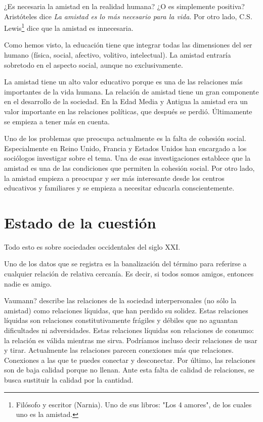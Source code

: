 \documentclass[palatino]{apuntesURJC}
\begin{document}
¿Es necesaria la amistad en la realidad humana? ¿O es simplemente positiva?
%
Aristóteles dice \textit{La amistad es lo más necesario para la vida}. 
%
Por otro lado, C.S. Lewis\footnote{Filósofo y escritor (Narnia). Uno de sus libros: "Los 4 amores", de los cuales uno es la amistad.} dice que la amistad es innecesaria.

Como hemos visto, la educación tiene que integrar todas las dimensiones del ser humano (física, social, afectivo, volitivo, intelectual).
%
La amistad entraría sobretodo en el aspecto social, aunque no exclusivamente.

La amistad tiene un alto valor educativo porque es una de las relaciones más importantes de la vida humana.
%
La relación de amistad tiene un gran componente en el desarrollo de la sociedad.
%
En la Edad Media y Antigua la amistad era un valor importante en las relaciones políticas, que después se perdió.
%
Últimamente se empieza a tener más en cuenta.

Uno de los problemas que preocupa actualmente es la falta de cohesión social. 
%
Especialmente en Reino Unido, Francia y Estados Unidos han encargado a los sociólogos investigar sobre el tema.
%
Una de esas investigaciones establece que la amistad es una de las condiciones que permiten la cohesión social.
%
Por otro lado, la amistad empieza a preocupar y ser más interesante desde los centros educativos y familiares y se empieza a necesitar educarla conscientemente.

\section{Estado de la cuestión}

Todo esto es sobre sociedades occidentales del siglo XXI.

Uno de los datos que se registra es la banalización del término para referirse a cualquier relación de relativa cercanía. Es decir, si todos somos amigos, entonces nadie es amigo.

Vaumann? describe las relaciones de la sociedad interpersonales (no sólo la amistad) como relaciones líquidas, que han perdido su solidez.
%
Estas relaciones líquidas son relaciones constitutivamente frágiles y débiles que no aguantan dificultades ni adversidades.
%
Estas relaciones líquidas son relaciones de consumo: 
%
la relación es válida mientras me sirva. 
%
Podríamos incluso decir relaciones de usar y tirar.
%
Actualmente las relaciones parecen conexiones más que relaciones.
%
Conexiones a las que te puedes conectar y desconectar.
%
Por último, las relaciones son de baja calidad porque no llenan.
%
Ante esta falta de calidad de relaciones, se busca sustituir la calidad por la cantidad.
\end{document}
